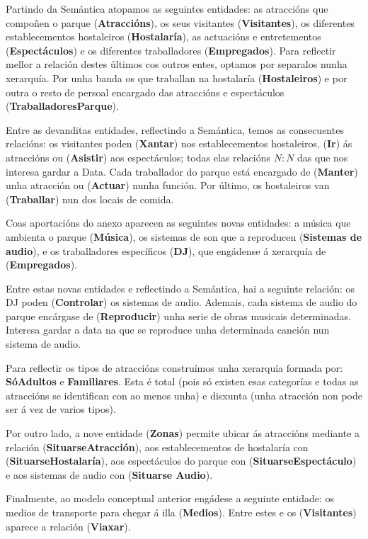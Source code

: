 \documentclass[12pt,a4paper]{book}
\theoremstyle{definition}
\theoremstyle{break}
\begin{document}
	Partindo da Semántica atopamos as seguintes entidades: as atraccións que compoñen o parque (\textbf{Atraccións}), os seus visitantes (\textbf{Visitantes}), os diferentes establecementos hostaleiros (\textbf{Hostalaría}), as actuacións e entretementos (\textbf{Espectáculos}) e os diferentes traballadores (\textbf{Empregados}). Para reflectir mellor a relación destes últimos cos outros entes, optamos por separalos nunha xerarquía. Por unha banda os que traballan na hostalaría (\textbf{Hostaleiros}) e por outra o resto de persoal encargado das atraccións e espectáculos (\textbf{TraballadoresParque}).
	
	Entre as devanditas entidades, reflectindo a Semántica, temos as consecuentes relacións: os visitantes poden (\textbf{Xantar}) nos establecementos hostaleiros, (\textbf{Ir}) ás atraccións ou (\textbf{Asistir}) aos espectáculos; todas elas relacións $N:N$ das que nos interesa gardar a Data. Cada traballador do parque está encargado de (\textbf{Manter}) unha atracción ou (\textbf{Actuar}) nunha función. Por último, os hostaleiros van (\textbf{Traballar}) nun dos locais de comida.
	
	Coas aportacións do anexo aparecen as seguintes novas entidades: a música que ambienta o
	parque (\textbf{Música}), os sistemas de son que a reproducen (\textbf{Sistemas de audio}),
	e os traballadores específicos (\textbf{DJ}), que engádense á xerarquía de (\textbf{Empregados}).
	
	Entre estas novas entidades e reflectindo a Semántica, hai a seguinte relación: os DJ poden (\textbf{Controlar}) os sistemas de audio. Ademais, cada sistema
	de audio do parque encárgase de (\textbf{Reproducir}) unha serie de obras musicais determinadas. Interesa gardar a data na que se reproduce unha determinada
	canción nun sistema de audio.
	
	Para reflectir os tipos de atraccións construímos unha xerarquía formada por: \textbf{SóAdultos} e
	\textbf{Familiares}. Esta é total (pois só existen esas categorías e todas as atraccións se
	identifican con ao menos unha) e disxunta (unha atracción non pode ser á vez de varios
	tipos).
	
	Por outro lado, a nove entidade (\textbf{Zonas}) permite ubicar ás atraccións mediante a relación (\textbf{SituarseAtracción}), aos establecementos de hostalaría con (\textbf{SituarseHostalaría}), aos espectáculos do parque con (\textbf{SituarseEspectáculo}) e aos sistemas de audio con (\textbf{Situarse Audio}).
	
	Finalmente, ao modelo conceptual anterior engádese a seguinte entidade: os medios de transporte para chegar á illa (\textbf{Medios}). Entre estes e os (\textbf{Visitantes}) aparece a relación (\textbf{Viaxar}).
	
\end{document}
